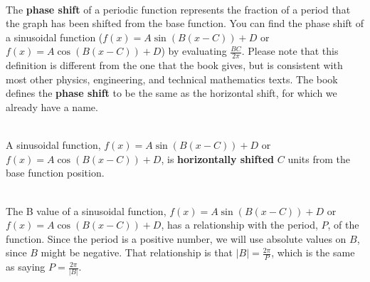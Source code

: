 \begin{myDefinition}~\\[0.5mm]
The \textbf{phase shift} of a periodic function represents the fraction of a period that the graph has been shifted from the base function. You can find the phase shift of a sinusoidal function ($f(x)=A\sin(B(x-C))+D$ or $f(x)=A\cos(B(x-C))+D$) by evaluating $\frac{BC}{2\pi}$. Please note that this definition is different from the one that the book gives, but is consistent with most other physics, engineering, and technical mathematics texts. The book defines the \textbf{phase shift} to be the same as the horizontal shift, for which we already have a name.
\end{myDefinition}

\begin{myDefinition}~\\[0.5mm]
A sinusoidal function, $f(x)=A\sin(B(x-C))+D$ or $f(x)=A\cos(B(x-C))+D$, is \textbf{horizontally shifted} $C$ units from the base function position.
\end{myDefinition}

\begin{myDefinition}~\\[0.5mm]
The B value of a sinusoidal function, $f(x)=A\sin(B(x-C))+D$ or $f(x)=A\cos(B(x-C))+D$, has a relationship with the period, $P$, of the function. Since the period is a positive number, we will use absolute values on $B$, since $B$ might be negative. That relationship is that $|B|=\frac{2\pi}{P}$, which is the same as saying $P=\frac{2\pi}{|B|}$. 
\end{myDefinition}

\newpage


